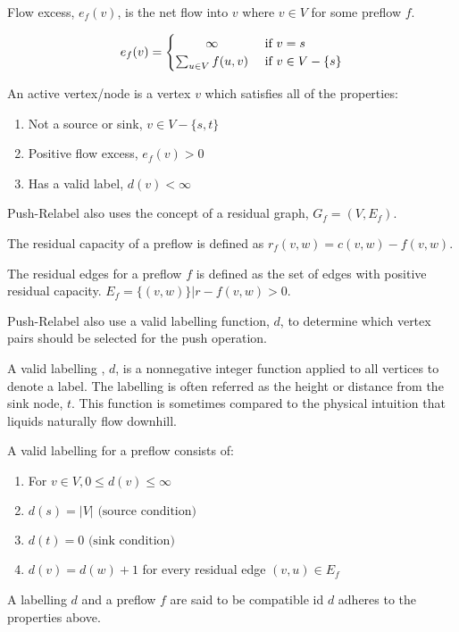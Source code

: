 \begin{definition}
	Flow excess, $e_f(v)$, is the net flow into $v$ where $v \in V$ for some preflow $f$.
\end{definition}

\[
e_f(v) =
\begin{cases} 
\hfill \infty \hfill & \text{ if $v=s$} \\
\hfill \sum_{u \in V}f(u,v) \hfill & \text{ if $v \in V-\{s\}$} \\
\end{cases}
\]

\begin{definition}
	An active vertex/node is a vertex $v$ which satisfies all of the properties:
	\begin{enumerate}
		\item Not a source or sink, $v \in V-\{s,t\}$
		\item Positive flow excess, $e_f(v) > 0$
		\item Has a valid label, $d(v) < \infty$
	\end{enumerate}
\end{definition}

Push-Relabel also uses the concept of a residual graph, $G_f=(V, E_f)$.

\begin{definition}
	The residual capacity of a preflow is defined as $r_f(v,w) = c(v,w)-f(v,w)$.
\end{definition}

\begin{definition}
	The residual edges for a preflow $f$ is defined as the set of edges with positive residual capacity. $E_f = \{(v,w)\} | r-f(v,w) > 0$.
\end{definition}

\begin{definition}[Labelling]
	Push-Relabel also use a valid labelling function, $d$, to determine which vertex pairs should be selected for the push operation.
\end{definition}
A valid labelling , $d$, is a nonnegative integer function applied to all vertices to denote a label. The labelling is often referred as the height or distance from the sink node, $t$. This function is sometimes compared to the physical intuition that liquids naturally flow downhill.

A valid labelling for a preflow consists of:
\begin{enumerate}
	\item For $v \in V, 0 \leq d(v) \leq \infty$
	\item $d(s) = |V| \text{ (source condition)}$
	\item $d(t) = 0 \text{ (sink condition)}$
	\item $d(v) = d(w) + 1$ for every residual edge $(v,u) \in E_f$
\end{enumerate}
A labelling $d$ and a preflow $f$ are said to be compatible id $d$ adheres to the properties above.

